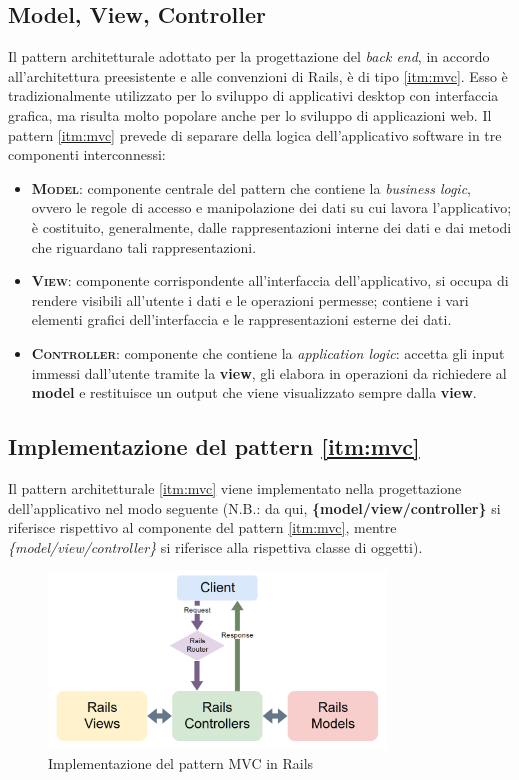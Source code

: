 \subsection{Model, View, Controller}
Il pattern architetturale adottato per la progettazione del \textit{back end}, in accordo all'architettura preesistente e alle convenzioni di Rails, è di tipo \ref{itm:mvc}. Esso è tradizionalmente utilizzato per lo sviluppo di applicativi desktop con interfaccia grafica, ma risulta molto popolare anche per lo sviluppo di applicazioni web. Il pattern \ref{itm:mvc} prevede di separare della logica dell'applicativo software in tre componenti interconnessi:
\begin{itemize}
    \item \textsc{\textbf{Model}}: componente centrale del pattern che contiene la \textit{business logic}, ovvero le regole di accesso e manipolazione dei dati su cui lavora l'applicativo; è costituito, generalmente, dalle rappresentazioni interne dei dati e dai metodi che riguardano tali rappresentazioni.
    \item \textsc{\textbf{View}}: componente corrispondente all'interfaccia dell'applicativo, si occupa di rendere visibili all'utente i dati e le operazioni permesse; contiene i vari elementi grafici dell'interfaccia e le rappresentazioni esterne dei dati.
    \item \textsc{\textbf{Controller}}: componente che contiene la \textit{application logic}: accetta gli input immessi dall'utente tramite la \textbf{view}, gli elabora in operazioni da richiedere al \textbf{model} e restituisce un output che viene visualizzato sempre dalla \textbf{view}.
\end{itemize}
\vspace{12pt}
\subsection{Implementazione del pattern \ref{itm:mvc}}
Il pattern architetturale \ref{itm:mvc} viene implementato nella progettazione dell'applicativo nel modo seguente (N.B.: da qui, \textbf{\{model/view/controller\}} si riferisce rispettivo al componente del pattern \ref{itm:mvc}, mentre \textit{\{model/view/controller\}} si riferisce alla rispettiva classe di oggetti).

\begin{figure}[h!]
        \centering
        \includegraphics[width=0.8\textwidth]{figures/railsme.png}
        \caption[Implementazione del pattern MVC in Rails]{Implementazione del pattern MVC in Rails
        \label{fig:mvcrails}}
    \end{figure}  

